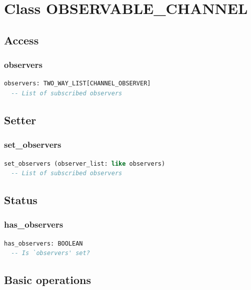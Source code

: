 \section{Class OBSERVABLE\_CHANNEL}
\label{sec:feed-observable-channel}


\subsection{Access}
\label{sec:feed-observable-channel-access}

\subsubsection{observers}

\begin{lstlisting}[language=Eiffel]
observers: TWO_WAY_LIST[CHANNEL_OBSERVER]
  -- List of subscribed observers
\end{lstlisting}


\subsection{Setter}
\label{sec:feed-observable-channel-setter}

\subsubsection{set\_observers}

\begin{lstlisting}[language=Eiffel]
set_observers (observer_list: like observers)
  -- List of subscribed observers
\end{lstlisting}


\subsection{Status}
\label{sec:feed-observable-channel-status}

\subsubsection{has\_observers}

\begin{lstlisting}[language=Eiffel]
has_observers: BOOLEAN
  -- Is `observers' set?
\end{lstlisting}


\subsection{Basic operations}
\label{sec:feed-observable-channel-basic-operations}


